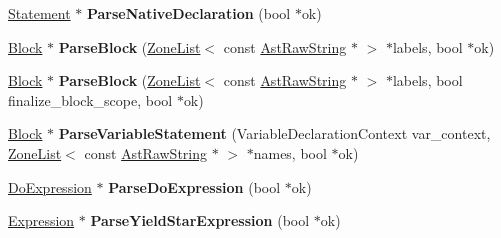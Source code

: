 \begin{DoxyCompactItemize}
\item 
\hyperlink{classv8_1_1internal_1_1_statement}{Statement} $\ast$ {\bfseries Parse\+Native\+Declaration} (bool $\ast$ok)\hypertarget{classv8_1_1internal_1_1_parser_a3f27deb18e2f2de9e3cb81f94750d352}{}\label{classv8_1_1internal_1_1_parser_a3f27deb18e2f2de9e3cb81f94750d352}

\item 
\hyperlink{classv8_1_1internal_1_1_block}{Block} $\ast$ {\bfseries Parse\+Block} (\hyperlink{classv8_1_1internal_1_1_zone_list}{Zone\+List}$<$ const \hyperlink{classv8_1_1internal_1_1_ast_raw_string}{Ast\+Raw\+String} $\ast$ $>$ $\ast$labels, bool $\ast$ok)\hypertarget{classv8_1_1internal_1_1_parser_a09b173ca0edd1d116851c364d78efe53}{}\label{classv8_1_1internal_1_1_parser_a09b173ca0edd1d116851c364d78efe53}

\item 
\hyperlink{classv8_1_1internal_1_1_block}{Block} $\ast$ {\bfseries Parse\+Block} (\hyperlink{classv8_1_1internal_1_1_zone_list}{Zone\+List}$<$ const \hyperlink{classv8_1_1internal_1_1_ast_raw_string}{Ast\+Raw\+String} $\ast$ $>$ $\ast$labels, bool finalize\+\_\+block\+\_\+scope, bool $\ast$ok)\hypertarget{classv8_1_1internal_1_1_parser_a86a795bf5d36ece4d2ed001678b054f3}{}\label{classv8_1_1internal_1_1_parser_a86a795bf5d36ece4d2ed001678b054f3}

\item 
\hyperlink{classv8_1_1internal_1_1_block}{Block} $\ast$ {\bfseries Parse\+Variable\+Statement} (Variable\+Declaration\+Context var\+\_\+context, \hyperlink{classv8_1_1internal_1_1_zone_list}{Zone\+List}$<$ const \hyperlink{classv8_1_1internal_1_1_ast_raw_string}{Ast\+Raw\+String} $\ast$ $>$ $\ast$names, bool $\ast$ok)\hypertarget{classv8_1_1internal_1_1_parser_a5bbc885d38f3d7ddc4788f2130ebf5bb}{}\label{classv8_1_1internal_1_1_parser_a5bbc885d38f3d7ddc4788f2130ebf5bb}

\item 
\hyperlink{classv8_1_1internal_1_1_do_expression}{Do\+Expression} $\ast$ {\bfseries Parse\+Do\+Expression} (bool $\ast$ok)\hypertarget{classv8_1_1internal_1_1_parser_a7dfa65f4513249d707b61853d9ab62b1}{}\label{classv8_1_1internal_1_1_parser_a7dfa65f4513249d707b61853d9ab62b1}

\item 
\hyperlink{classv8_1_1internal_1_1_expression}{Expression} $\ast$ {\bfseries Parse\+Yield\+Star\+Expression} (bool $\ast$ok)\hypertarget{classv8_1_1internal_1_1_parser_ae13fb4f01a5fcc03e8a8d0e72500ed22}{}\label{classv8_1_1internal_1_1_parser_ae13fb4f01a5fcc03e8a8d0e72500ed22}


\end{DoxyCompactItemize}
